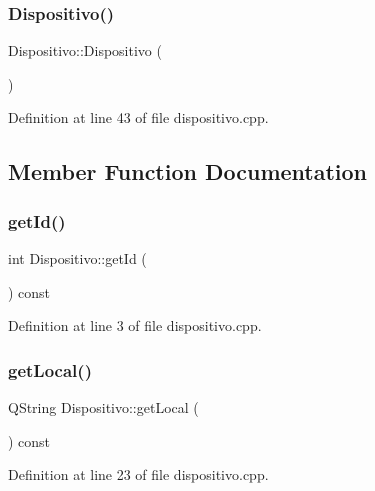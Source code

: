 \subsubsection{\texorpdfstring{Dispositivo()}{Dispositivo()}}
{\footnotesize\ttfamily Dispositivo\+::\+Dispositivo (\begin{DoxyParamCaption}{ }\end{DoxyParamCaption})}



Definition at line 43 of file dispositivo.\+cpp.



\subsection{Member Function Documentation}
\hypertarget{class_dispositivo_a4d470c1481fd167db94e6be4f08a259c}{}\label{class_dispositivo_a4d470c1481fd167db94e6be4f08a259c} 
\subsubsection{\texorpdfstring{get\+Id()}{getId()}}
{\footnotesize\ttfamily int Dispositivo\+::get\+Id (\begin{DoxyParamCaption}{ }\end{DoxyParamCaption}) const}



Definition at line 3 of file dispositivo.\+cpp.

\hypertarget{class_dispositivo_a29327cf38f2c0b021e1197f12d02bf9c}{}\label{class_dispositivo_a29327cf38f2c0b021e1197f12d02bf9c} 
\subsubsection{\texorpdfstring{get\+Local()}{getLocal()}}
{\footnotesize\ttfamily Q\+String Dispositivo\+::get\+Local (\begin{DoxyParamCaption}{ }\end{DoxyParamCaption}) const}



Definition at line 23 of file dispositivo.\+cpp.

\hypertarget{class_dispositivo_a463552b0487176c52c477d7951287b4b}{}\label{class_dispositivo_a463552b0487176c52c477d7951287b4b} 
